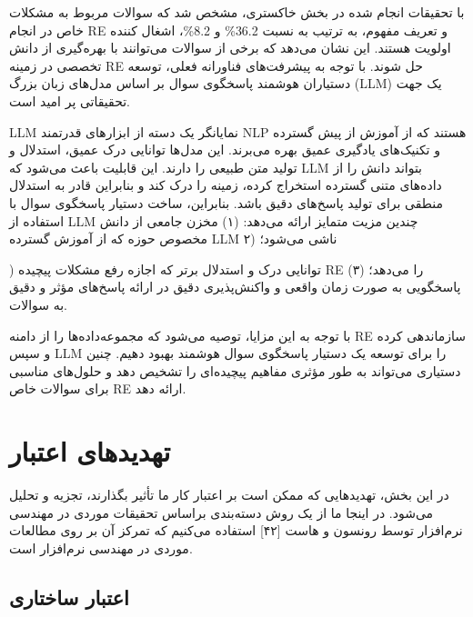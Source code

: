 \documentclass[a4paper,10pt]{article}
\begin{document}
            با تحقیقات انجام شده در بخش خاکستری، مشخص شد که سوالات مربوط به مشکلات خاص در انجام RE و تعریف مفهوم، به ترتیب به نسبت 36.2\% و 8.2\%، اشغال کننده اولویت هستند. این نشان می‌دهد که برخی از سوالات می‌توانند با بهره‌گیری از دانش تخصصی در زمینه RE حل شوند. با توجه به پیشرفت‌های فناورانه فعلی، توسعه دستیاران هوشمند پاسخگوی سوال بر اساس مدل‌های زبان بزرگ (LLM) یک جهت تحقیقاتی پر امید است.

            LLM نمایانگر یک دسته از ابزارهای قدرتمند NLP هستند که از آموزش از پیش گسترده و تکنیک‌های یادگیری عمیق بهره می‌برند. این مدل‌ها توانایی درک عمیق، استدلال و تولید متن طبیعی را دارند. این قابلیت باعث می‌شود که LLM بتواند دانش را از داده‌های متنی گسترده استخراج کرده، زمینه را درک کند و بنابراین قادر به استدلال منطقی برای تولید پاسخ‌های دقیق باشد. بنابراین، ساخت دستیار پاسخگوی سوال با استفاده از LLM چندین مزیت متمایز ارائه می‌دهد: (۱) مخزن جامعی از دانش مخصوص حوزه که از آموزش گسترده LLM ناشی می‌شود؛ (۲

            ) توانایی درک و استدلال برتر که اجازه رفع مشکلات پیچیده RE را می‌دهد؛ (۳) پاسخگویی به صورت زمان واقعی و واکنش‌پذیری دقیق در ارائه پاسخ‌های مؤثر و دقیق به سوالات.

            با توجه به این مزایا، توصیه می‌شود که مجموعه‌داده‌ها را از دامنه RE سازماندهی کرده و سپس LLM را برای توسعه یک دستیار پاسخگوی سوال هوشمند بهبود دهیم. چنین دستیاری می‌تواند به طور مؤثری مفاهیم پیچیده‌ای را تشخیص دهد و حلول‌های مناسبی برای سوالات خاص RE ارائه دهد.



    \section{تهدیدهای اعتبار}

        در این بخش، تهدیدهایی که ممکن است بر اعتبار کار ما تأثیر بگذارند، تجزیه و تحلیل می‌شود. در اینجا ما از یک روش دسته‌بندی براساس تحقیقات موردی در مهندسی نرم‌افزار توسط رونسون و هاست [۴۲] استفاده می‌کنیم که تمرکز آن بر روی مطالعات موردی در مهندسی نرم‌افزار است.

        \subsection{اعتبار ساختاری}
\end{document}
